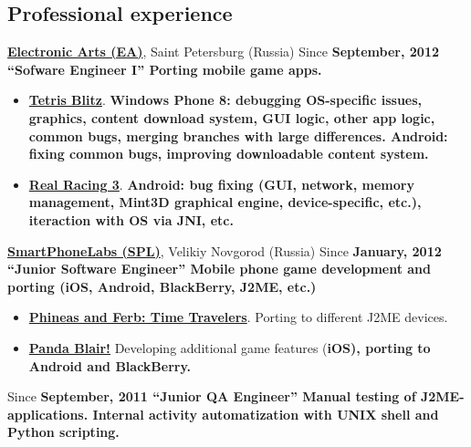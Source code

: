 \begin{flushright}
\section{Professional experience}
{
\fontsize{14pt}{12pt}\selectfont
\href{http://www.ea.com}{\bfseries Electronic Arts (EA)\mdseries},
Saint Petersburg (Russia)
}
\subitem Since \bfseries September, 2012 \mdseries ``Sofware Engineer I''
\subitem Porting mobile game apps.
\begin{itemize}
\setlength{\itemindent}{20pt}
\item
    \href{http://www.windowsphone.com/en-us/store/app/tetris-blitz/806c88c7-528c-4563-9c0a-09ef31f14d61}
    {\bfseries Tetris Blitz\mdseries}. \bfseries Windows Phone 8\mdseries:
debugging OS-specific issues, graphics, content download system,
GUI logic, other app logic, common bugs,
merging branches with large differences.\linebreak
\bfseries Android\mdseries: fixing common bugs,
    improving downloadable content system.
\item
    \href{http://www.facebook.com/realracing}
    {\bfseries Real Racing 3\mdseries}.
    \bfseries Android\mdseries: bug fixing
    (GUI, network, memory management, Mint3D graphical engine,
    device-specific, etc.), iteraction with OS via JNI, etc.
\end{itemize}

{
\vspace{15pt}
\fontsize{14pt}{12pt}\selectfont
\href{http://spl.co}{\bfseries SmartPhoneLabs (SPL)\mdseries},
Velikiy Novgorod (Russia)
}
\subitem Since \bfseries January, 2012 \mdseries ``Junior Software Engineer''
\subitem Mobile phone game development and porting
(iOS, Android, BlackBerry, J2ME, etc.)
\begin{itemize}
\setlength{\itemindent}{20pt}
\item
    \href{http://java.mob.org/game/phineas\_and\_ferb\_time\_travelers.html}
        {\bfseries Phineas and Ferb: Time Travelers\mdseries}.
        Porting to different J2ME devices.
\item
    \href{https://itunes.apple.com/us/app/panda-blair!/id500995558?mt=8}
        {\bfseries Panda Blair!\mdseries}
        Developing additional game features (\bfseries iOS\mdseries),
        porting to \bfseries Android \mdseries and \bfseries BlackBerry\mdseries.
\end{itemize}

\vspace{15pt}
\subitem Since \bfseries September, 2011 \mdseries ``Junior QA Engineer''
\subitem Manual testing of J2ME-applications.
\subitem Internal activity automatization with \bfseries UNIX shell \mdseries and \bfseries Python \mdseries scripting.


\end{flushright}
